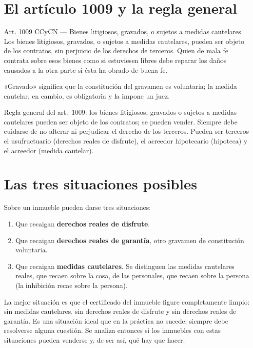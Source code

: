 \documentclass[12pt,oneside]{book}
\begin{document}
\section{El artículo 1009 y la regla general}

\begin{definition}{Art. 1009 CCyCN --- Bienes litigiosos, gravados, o sujetos a medidas cautelares}
Los bienes litigiosos, gravados, o sujetos a medidas cautelares, pueden ser objeto de los contratos, sin perjuicio de los derechos de terceros. Quien de mala fe contrata sobre esos bienes como si estuviesen libres debe reparar los daños causados a la otra parte si ésta ha obrado de buena fe.
\end{definition}

«Gravado» significa que la constitución del gravamen es voluntaria; la medida cautelar, en cambio, es obligatoria y la impone un juez.

\begin{important}
Regla general del art.\ 1009: los bienes litigiosos, gravados o sujetos a medidas cautelares pueden ser objeto de los contratos; se pueden vender. Siempre debe cuidarse de no alterar ni perjudicar el derecho de los terceros. Pueden ser terceros el usufructuario (derechos reales de disfrute), el acreedor hipotecario (hipoteca) y el acreedor (medida cautelar).
\end{important}

\section{Las tres situaciones posibles}

Sobre un inmueble pueden darse tres situaciones:
\begin{enumerate}
\item Que recaigan \textbf{derechos reales de disfrute}.
\item Que recaigan \textbf{derechos reales de garantía}, otro gravamen de constitución voluntaria.
\item Que recaigan \textbf{medidas cautelares}. Se distinguen las medidas cautelares reales, que recaen sobre la cosa, de las personales, que recaen sobre la persona (la inhibición recae sobre la persona).
\end{enumerate}

La mejor situación es que el certificado del inmueble figure completamente limpio: sin medidas cautelares, sin derechos reales de disfrute y sin derechos reales de garantía. Es una situación ideal que en la práctica no sucede; siempre debe resolverse alguna cuestión. Se analiza entonces si los inmuebles con estas situaciones pueden venderse y, de ser así, qué hay que hacer.
\end{document}

